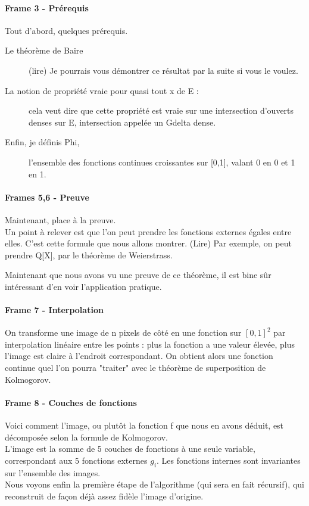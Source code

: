 \documentclass[12pt,a4paper]{article}
\begin{document}
\paragraph{Frame 3 - Prérequis}
Tout d'abord, quelques prérequis.\\
\begin{description}
\item[Le théorème de Baire] (lire) Je pourrais vous démontrer ce résultat par la suite si vous le voulez.
\item[La notion de propriété vraie pour quasi tout x de E :] cela veut dire que cette propriété est vraie sur une intersection d'ouverts denses sur E, intersection appelée un Gdelta dense.
\item[Enfin, je définis Phi,] l'ensemble des fonctions continues croissantes sur [0,1], valant 0 en 0 et 1 en 1.
\end{description}

\paragraph{Frames 5,6 - Preuve}
Maintenant, place à la preuve.\\
Un point à relever est que l'on peut prendre les fonctions externes égales entre elles. C'est cette formule que nous allons montrer.
(Lire)
Par exemple, on peut prendre Q[X], par le théorème de Weierstrass.

Maintenant que nous avons vu une preuve de ce théorème, il est bine sûr intéressant d'en voir l'application pratique.
\paragraph{Frame 7 - Interpolation}
On transforme une image de n pixels de côté en une fonction sur $[0,1]^2$ par interpolation linéaire entre les points : plus la fonction a une valeur élevée, plus l'image est claire à l'endroit correspondant. On obtient alors une fonction continue quel l'on pourra "traiter" avec le théorème de superposition de Kolmogorov.\\

\paragraph{Frame 8 - Couches de fonctions}
Voici comment l'image, ou plutôt la fonction f que nous en avons déduit, est décomposée selon la formule de Kolmogorov.\\ L'image est la somme de 5 couches de fonctions à une seule variable, correspondant aux 5 fonctions externes $g_i$. Les fonctions internes sont invariantes sur l'ensemble des images.\\
Nous voyons enfin la première étape de l'algorithme (qui sera en fait récursif), qui reconstruit de façon déjà assez fidèle l'image d'origine.\\
\end{document}
